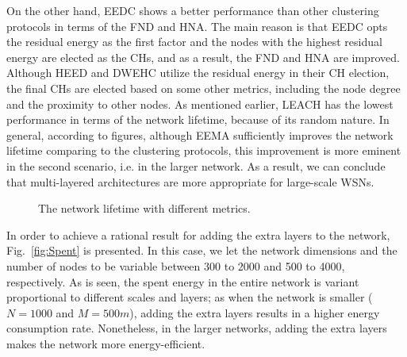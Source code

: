\documentclass[journal]{IEEEtran}
\begin{document}
On the other hand, EEDC shows a better performance than other clustering protocols in terms of the FND and HNA.  The main reason is that EEDC opts the residual energy as the first factor and the nodes with the highest residual energy are elected as the CHs, and as a result, the FND and HNA are improved.  Although HEED and DWEHC utilize the residual energy in their CH election, the final CHs are elected based on some other metrics, including the node degree and the proximity to other nodes.  As mentioned earlier, LEACH has the lowest performance in terms of the network lifetime, because of its random nature.  In general, according to figures, although EEMA sufficiently improves the network lifetime comparing to the clustering protocols, this improvement is more eminent in the second scenario, i.e. in the larger network.  As a result, we can conclude that multi-layered architectures are more appropriate for large-scale WSNs. 

\begin{figure*}[t]
	\centering
	\caption[Optional caption for list of figures]{The network lifetime with different metrics.}
	\label{fig:Lifetime}
\end{figure*}

In order to achieve a rational result for adding the extra layers to the network, Fig.~\ref{fig:Spent} is presented.  In this case, we let the network dimensions and the number of nodes to be variable between 300 to 2000 and 500 to 4000, respectively. As is seen, the spent energy in the entire network is variant proportional to different scales and layers; as when the network is smaller ($N=1000$ and $M=500m$), adding the extra layers results in a higher energy consumption rate.  Nonetheless, in the larger networks, adding the extra layers makes the network more energy-efficient.
\end{document}
